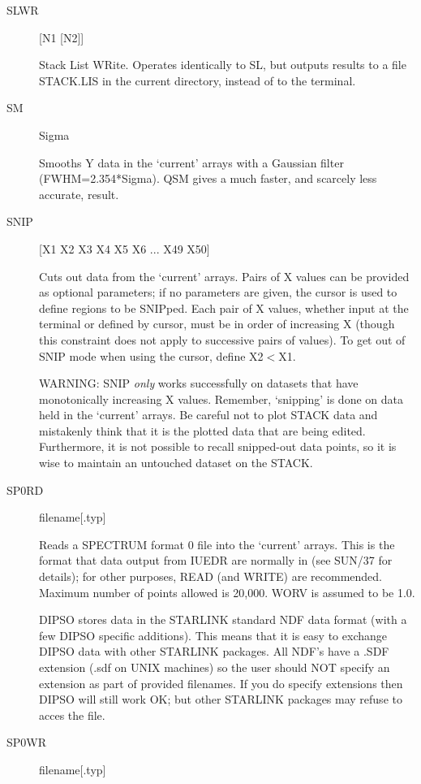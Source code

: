 \begin {description}
\item [SLWR] [N1 [N2]]

Stack List WRite. Operates identically to SL, but outputs results to a
file STACK.LIS in the current directory, instead of to the terminal.

\item [SM] Sigma

Smooths Y data in the `current' arrays with a Gaussian filter
(FWHM=2.354*Sigma). QSM gives a much faster, and scarcely less
accurate, result.

\item [SNIP] [X1 X2   X3 X4   X5 X6 ... X49 X50]

Cuts out data from the `current' arrays. Pairs of X values can be
provided as optional parameters; if no parameters are given, the
cursor is used to define regions to be SNIPped. Each pair of X values,
whether input at the terminal or defined by cursor, must be in order
of increasing X (though this constraint does not apply to successive
pairs of values). To get out of SNIP mode when using the cursor,
define X2$<$X1.

WARNING: SNIP {\em only} works successfully on datasets that have
monotonically increasing X values. Remember, `snipping' is done on
data held in the `current' arrays. Be careful not to plot STACK data
and mistakenly think that it is the plotted data that are being
edited. Furthermore, it is not possible to recall snipped-out data
points, so it is wise to maintain an untouched dataset on the STACK.

\item [SP0RD] filename[.typ]

Reads a SPECTRUM format 0 file into the `current' arrays. This is the
format that data output from IUEDR are normally in (see SUN/37 for
details);  for other purposes,  READ (and WRITE) are recommended.
Maximum number of points allowed is 20,000. WORV is assumed to be 1.0.

DIPSO stores data in the STARLINK standard NDF data format (with a few
DIPSO specific additions). This means that it is easy to exchange
DIPSO data with other STARLINK packages. All NDF's have a .SDF
extension (.sdf on UNIX machines) so the user should NOT specify an
extension as part of provided filenames. If you do specify extensions
then DIPSO will still work OK; but other STARLINK packages may refuse
to acces the file.


\item [SP0WR] filename[.typ]


\end{description}
